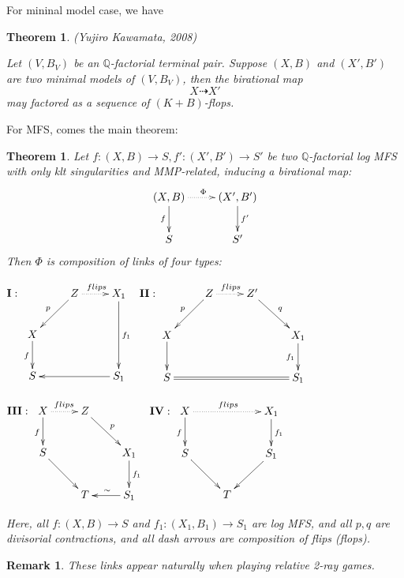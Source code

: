 \documentclass{article}
\newtheorem{thm}[defn]{Theorem}
\newtheorem{rmk}[defn]{Remark}
\begin{document}
For mininal model case, we have
\begin{thm}
	(Yujiro Kawamata, 2008)
	
	Let $ (V,B_V) $ be an $ \mathbb{Q} $-factorial terminal  pair. Suppose $ (X,B) $ and $ (X',B') $ are two minimal models of $ (V,B_V) $, then the birational map 
	$$ X\dashrightarrow X' $$
	may factored as a sequence of $ (K+B) $-flops.
\end{thm}
For MFS, comes  the main theorem:
\begin{thm}
	Let $ f:(X,B)\to S,f':(X',B')\to S' $ be two $ \mathbb{Q} $-factorial log MFS  with only klt singularities and MMP-related, inducing a birational map:
	$$ \xymatrix{
		(X,B)\ar[d]_f\ar@{.>}[r]^\Phi&(X',B')\ar[d]^{f'}\\
		S&S'} $$
	Then $ \Phi  $ is composition  of links of  four types:
	
	$ \textbf{I} : \xymatrix{
		&Z\ar[ld]_p\ar@{.>}[r]^{flips}&X_1\ar[dd]^{f_1}\\
		X\ar[d]_f&&\\
		S &&S_1\ar[ll]}$
	$ \textbf{II} : \xymatrix{
		&Z\ar[ld]_p\ar@{.>}[r]^{flips}&Z'\ar[dr]^{q}&\\
		X\ar[d]&&&X_1\ar[d]_{f_1}\\
		S\ar@{=}[rrr]&&&S_1} $
	
	$ \textbf{III} :\xymatrix{
		X\ar[d]_f\ar@{.>}[r]^{flips}&Z\ar[rd]^{p}&\\
		S\ar[dr]&&X_1\ar[d]^{f_1}\\
		&T&S_1\ar[l]_\sim}$
	$  \textbf{IV}:\xymatrix{
		X\ar[d]_f\ar@{.>}[rr]^{flips}&&X_1\ar[d]^{f_1}\\
		S\ar[dr]&&S_1\ar[dl]\\
		&T &}$

	Here, all $ f:(X,B)\to S $ and $ f_1:(X_1,B_1)\to S_1 $ are log MFS, and all $ p,q $ are divisorial contractions, and all dash arrows are composition of flips (flops). 
\end{thm}
\begin{rmk}
	These links appear naturally when playing relative 2-ray games.
\end{rmk}
\end{document}
